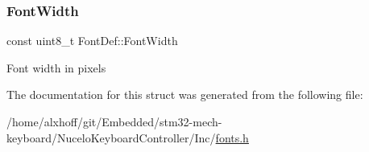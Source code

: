 \subsubsection{\texorpdfstring{Font\+Width}{FontWidth}}
{\footnotesize\ttfamily const uint8\+\_\+t Font\+Def\+::\+Font\+Width}

Font width in pixels 

The documentation for this struct was generated from the following file\+:\begin{DoxyCompactItemize}
\item 
/home/alxhoff/git/\+Embedded/stm32-\/mech-\/keyboard/\+Nucelo\+Keyboard\+Controller/\+Inc/\hyperlink{fonts_8h}{fonts.\+h}\end{DoxyCompactItemize}
